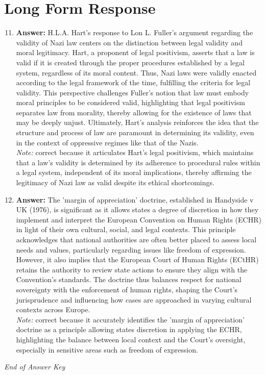 \documentclass[12pt]{article}
\begin{document}
\section*{Long Form Response}
\begin{enumerate}[label=\arabic*.]
\setcounter{enumi}{10}
\item \textbf{Answer:} H.L.A. Hart's response to Lon L. Fuller's argument regarding the validity of Nazi law centers on the distinction between legal validity and moral legitimacy. Hart, a proponent of legal positivism, asserts that a law is valid if it is created through the proper procedures established by a legal system, regardless of its moral content. Thus, Nazi laws were validly enacted according to the legal framework of the time, fulfilling the criteria for legal validity. This perspective challenges Fuller's notion that law must embody moral principles to be considered valid, highlighting that legal positivism separates law from morality, thereby allowing for the existence of laws that may be deeply unjust. Ultimately, Hart's analysis reinforces the idea that the structure and process of law are paramount in determining its validity, even in the context of oppressive regimes like that of the Nazis.
\\ \textit{Note:} correct because it articulates Hart's legal positivism, which maintains that a law's validity is determined by its adherence to procedural rules within a legal system, independent of its moral implications, thereby affirming the legitimacy of Nazi law as valid despite its ethical shortcomings.
\item \textbf{Answer:} The 'margin of appreciation' doctrine, established in Handyside v UK (1976), is significant as it allows states a degree of discretion in how they implement and interpret the European Convention on Human Rights (ECHR) in light of their own cultural, social, and legal contexts. This principle acknowledges that national authorities are often better placed to assess local needs and values, particularly regarding issues like freedom of expression. However, it also implies that the European Court of Human Rights (ECtHR) retains the authority to review state actions to ensure they align with the Convention's standards. The doctrine thus balances respect for national sovereignty with the enforcement of human rights, shaping the Court's jurisprudence and influencing how cases are approached in varying cultural contexts across Europe.
\\ \textit{Note:} correct because it accurately identifies the 'margin of appreciation' doctrine as a principle allowing states discretion in applying the ECHR, highlighting the balance between local context and the Court's oversight, especially in sensitive areas such as freedom of expression.
\end{enumerate}

\vfill
\noindent\textit{End of Answer Key}
\end{document}
